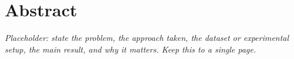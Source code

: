 
\chapter*{Abstract}


\noindent
\textit{Placeholder: state the problem, the approach taken, the dataset
  or experimental setup, the main result, and why it matters. Keep this
to a single page.}
